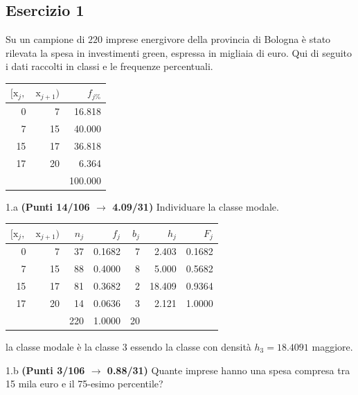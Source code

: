 \documentclass[
  11pt,
]{book}
\theoremstyle{mytheoremstyle}
\theoremstyle{mydefstyle}
\newenvironment{sol}
  {
  \begin{tcolorbox}[enhanced,breakable,arc=0.1mm,boxrule=1pt,colback=white,colframe=iblue,
  title=\bf \fontfamily{lmss}\selectfont \hspace{.5 cm} Soluzione,drop fuzzy shadow]

}{
\end{tcolorbox}
  }
\begin{document}
\subsection{Esercizio 1}\label{esercizio-1-14}

Su un campione di \(220\) imprese energivore della provincia di Bologna è stato
rilevata la spesa in investimenti green, espressa in migliaia di euro. Qui di seguito i dati raccolti in classi
e le frequenze percentuali.

\begin{table}[H]
\centering
\begin{tabular}{rrr}
\toprule
$[\text{x}_j,$ & $\text{x}_{j+1})$ & $f_{j\%}$\\
\midrule
0 & 7 & 16.818\\
7 & 15 & 40.000\\
15 & 17 & 36.818\\
17 & 20 & 6.364\\
 &  & 100.000\\
\bottomrule
\end{tabular}
\end{table}

1.a \textbf{(Punti 14/106 \(\rightarrow\) 4.09/31)} Individuare la classe modale.

\begin{sol}

\begin{table}[H]
\centering
\begin{tabular}{rrrrrrr}
\toprule
$[\text{x}_j,$ & $\text{x}_{j+1})$ & $n_j$ & $f_j$ & $b_j$ & $h_j$ & $F_j$\\
\midrule
0 & 7 & 37 & 0.1682 & 7 & 2.403 & 0.1682\\
7 & 15 & 88 & 0.4000 & 8 & 5.000 & 0.5682\\
15 & 17 & 81 & 0.3682 & 2 & 18.409 & 0.9364\\
17 & 20 & 14 & 0.0636 & 3 & 2.121 & 1.0000\\
 &  & 220 & 1.0000 & 20 &  & \\
\bottomrule
\end{tabular}
\end{table}

la classe modale è la classe \(3\) essendo la classe con densità \(h_{3}=18.4091\) maggiore.

\end{sol}

1.b \textbf{(Punti 3/106 \(\rightarrow\) 0.88/31)} Quante imprese hanno una spesa compresa tra 15 mila euro e il 75-esimo percentile?
\end{document}
